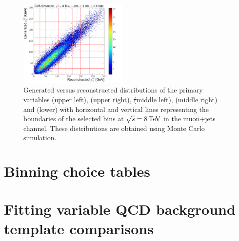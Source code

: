 \begin{figure}[hbtp]
	 \includegraphics[width=0.48\textwidth]{Chapters/04_Analysis/04b_XSections/images/binning/muon_WPT_8TeV.pdf}\hfill
	 \caption{Generated versus reconstructed distributions of the primary variables \met (upper left), \HT (upper
	 right), \st (middle left), \mt (middle right) and \wpt (lower) with horizontal and vertical lines
	 representing the boundaries of the selected bins at $\sqrt{s}=8\,\text{Te\hspace{-.08em}V}$ in the muon+jets channel. These
	 distributions are obtained using \ttbar Monte Carlo simulation.}
     \label{fig:binning_8TeV_muon}
 \end{figure}
 
\clearpage

\section{Binning choice tables}
\label{as:binning_tables_electron}






\clearpage
 
\section{Fitting variable QCD background template comparisons}
\label{as:fitting_variable_QCD_template_comparisons}


